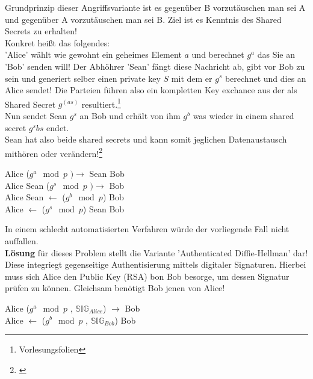 \documentclass[a4paper,12pt]{scrartcl}
\begin{document}
Grundprinzip dieser Angriffsvariante ist es gegenüber B vorzutäuschen man sei A und gegenüber A vorzutäuschen man sei B.
Ziel ist es Kenntnis des Shared Secrets zu erhalten!\\
Konkret heißt das folgendes:\\
'Alice' wählt wie gewohnt ein geheimes Element $a$ und berechnet $g^a$ das Sie an 'Bob' senden will!
Der Abhöhrer 'Sean' fängt diese Nachricht ab, gibt vor Bob zu sein und generiert selber einen private key $S$ mit dem er $g^s$ berechnet und dies an Alice sendet! Die Parteien führen also ein kompletten Key exchance aus der als Shared Secret $g^(as)$ resultiert.\footnote{Vorlesungsfolien}\\
Nun sendet Sean $g^s$ an Bob und erhält von ihm $g^b$ was wieder in einem shared secret $g^sbs$ endet.\\
Sean hat also beide shared secrets und kann somit jeglichen Datenaustausch mithören oder verändern!\footnote{\cite{10.1007/978-3-540-39927-8_28}}\\



\begin{center}
 Alice  ($g^a \mod p$ $)  \rightarrow$ \hspace{2cm}  Sean \hspace{4cm} Bob\\
 Alice   \hspace{3.9cm}  Sean ($g^s \mod p$ $) \rightarrow$ \hspace{2.1cm} Bob\\
 Alice   \hspace{3.9cm}  Sean \hspace{2.2cm} $\leftarrow$ ($g^b \mod p$) Bob\\
 Alice   \hspace{2.2cm}$\leftarrow$ ($g^s \mod p$)  Sean \hspace{4.1cm}  Bob\\
 

 
 
\end{center}

In einem schlecht automatisierten Verfahren würde der vorliegende Fall nicht auffallen.\\
\textbf{Lösung} für dieses Problem stellt die Variante 'Authenticated Diffie-Hellman' dar!\\
Diese integriegt gegenseitige Authentisierung mittels digitaler Signaturen. Hierbei muss sich Alice den Public Key (RSA) bon Bob besorge, um dessen Signatur prüfen zu können. Gleichsam benötigt Bob jenen von Alice!
\begin{center}
 Alice ($g^a \mod p$ , $\mathbb{\text{SIG}}_{Alice}$)  \hspace{3cm} $\rightarrow$ \hspace{2cm} Bob\\
 Alice   \hspace{3.4cm} $\leftarrow$ \hspace{2cm}($g^b \mod p$ , $\mathbb{\text{SIG}}_{Bob}$) Bob
\end{center}
\end{document}
